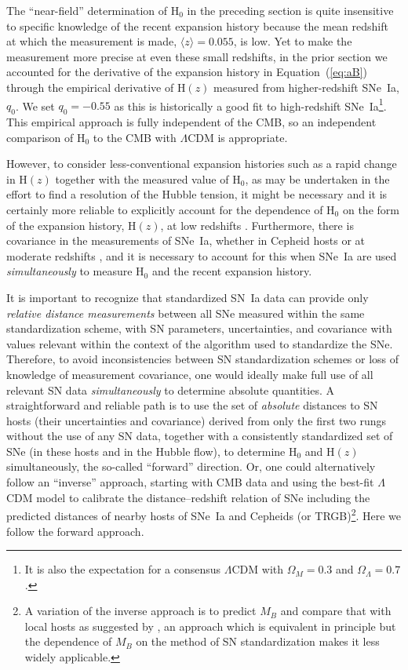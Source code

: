 \documentclass[12pt]{aastex631}
\begin{document}
The ``near-field'' determination of H$_0$ in the preceding section is quite insensitive  to specific knowledge of the recent expansion history because the mean redshift at which the measurement is made, $\langle z \rangle=0.055$, is low.  Yet to make the measurement more precise at even these small redshifts, in the prior section we accounted for the derivative of the expansion history in Equation~(\ref{eq:aB}) through the empirical derivative of H$(z)$ measured from higher-redshift SNe~Ia, $q_0$.  We set $q_0=-0.55$ as this is historically a good fit to high-redshift SNe~Ia\footnote{It is also the expectation for a consensus $\Lambda$CDM with $\Omega_M=0.3$ and $\Omega_\Lambda = 0.7$.}. This empirical approach is fully independent of the CMB, so an independent comparison of H$_0$ to the CMB with $\Lambda$CDM is appropriate.
  
However, to consider less-conventional expansion histories such as a rapid change in H$(z)$ together with the measured value of H$_0$, as may be undertaken in the effort to find a resolution of the Hubble tension, it might be necessary and it is certainly more reliable to explicitly account for the dependence of H$_0$ on the form of the expansion history, H$(z)$, at low redshifts \citep{Efstathiou:2021,Camarena:2021}. Furthermore, there is covariance in the measurements of SNe~Ia, whether in Cepheid hosts or at moderate redshifts \citep{Scolnic:2018,Dhawan:2020}, and it is necessary to account for this when SNe~Ia are used {\it simultaneously} to measure H$_0$ and the recent expansion history.

It is important to recognize that standardized SN~Ia data can provide only {\it relative distance measurements} between all SNe measured within the same standardization scheme, with SN parameters, uncertainties, and covariance with values relevant within the context of the algorithm used to standardize the SNe.    Therefore, to avoid inconsistencies between SN standardization schemes or loss of knowledge of measurement covariance, one would ideally make full use of all relevant SN data {\it simultaneously} to determine absolute quantities. A straightforward and reliable path is to use the set of {\it absolute} distances to SN hosts (their uncertainties and covariance) derived from only the first two rungs without the use of any SN data, together with a consistently standardized set of SNe (in these hosts and in the Hubble flow), to determine H$_0$ and H$(z)$ simultaneously, the so-called ``forward'' direction.  Or, one could alternatively follow an ``inverse'' approach, starting with CMB data and using the best-fit $\Lambda$CDM model to calibrate the distance--redshift relation of SNe including the predicted distances of nearby hosts of SNe~Ia and Cepheids (or TRGB)\footnote{A variation of the inverse approach is to predict $M_B$ and compare that with local hosts as suggested by \citet{Efstathiou:2021}, an approach which is equivalent in principle but the dependence of $M_B$ on the method of SN standardization makes it less widely applicable.}. Here we follow the forward approach.
\end{document}
